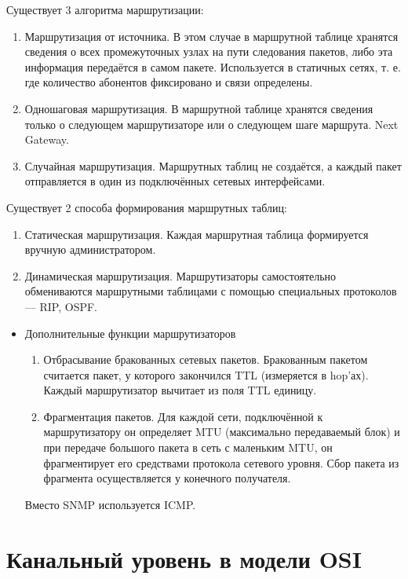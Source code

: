 \documentclass[12pt, russian, oneside, article]{ncc}
\begin{document}
Существует 3 алгоритма маршрутизации:
\begin{enumerate}
\item Маршрутизация от источника. В этом случае в маршрутной таблице хранятся сведения о всех промежуточных узлах на пути следования пакетов, либо эта информация передаётся в самом пакете. Используется в статичных сетях, т. е. где количество абонентов фиксировано и связи определены.
\item Одношаговая маршрутизация. В маршрутной таблице хранятся сведения только о следующем маршрутизаторе или о следующем шаге маршрута. Next Gateway.
\item Случайная маршрутизация. Маршрутных таблиц не создаётся, а каждый пакет отправляется в один из подключённых сетевых интерфейсами.
\end{enumerate}

Существует 2 способа формирования маршрутных таблиц:
\begin{enumerate}
\item Статическая маршрутизация. Каждая маршрутная таблица формируется вручную администратором.
\item Динамическая маршрутизация. Маршрутизаторы самостоятельно обмениваются маршрутными таблицами с помощью специальных протоколов --- RIP, OSPF.
\end{enumerate}
\begin{itemize}

\item Дополнительные функции маршрутизаторов\\
\label{sec-4_8_5_1}%
\begin{enumerate}
\item Отбрасывание бракованных сетевых пакетов. Бракованным пакетом считается пакет, у которого закончился TTL (измеряется в hop'ах). Каждый маршрутизатор вычитает из поля TTL единицу.
\item Фрагментация пакетов. Для каждой сети, подключённой к маршрутизатору он определяет MTU (максимально передаваемый блок) и при передаче большого пакета в сеть с маленьким MTU, он фрагментирует его средствами протокола сетевого уровня. Сбор пакета из фрагмента осуществляется у конечного получателя.
\end{enumerate}

Вместо SNMP используется ICMP.

\end{itemize} %
\section{Канальный уровень в модели OSI}
\label{sec-5}
\end{document}
